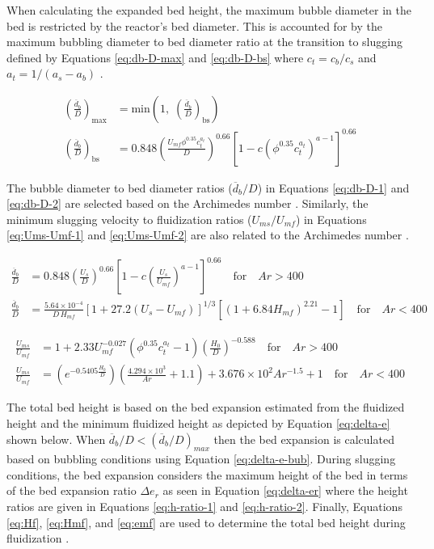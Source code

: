 \documentclass[12pt]{article}
\begin{document}
When calculating the expanded bed height, the maximum bubble diameter in the bed is restricted by the reactor's bed diameter. This is accounted for by the maximum bubbling diameter to bed diameter ratio at the transition to slugging defined by Equations \ref{eq:db-D-max} and \ref{eq:db-D-bs} where $c_t = c_b / c_s$ and $a_t = 1 / (a_s - a_b)$ \cite{Agu-2019g}.

\begin{align}
    \left( \frac{\overline{d}_b}{D} \right)_\text{max} &= \text{min} \left(1,\; \left( \frac{\overline{d}_b}{D} \right)_\text{bs} \right) \label{eq:db-D-max} \\
    \left( \frac{\overline{d}_b}{D} \right)_\text{bs} &= 0.848 \left( \frac{U_{mf} \phi^{0.35} c_t^{a_t}}{D} \right)^{0.66} \left[ 1 - c (\phi^{0.35} c_t^{a_t})^{a-1} \right]^{0.66} \label{eq:db-D-bs}
\end{align}

The bubble diameter to bed diameter ratios ($\overline{d}_b/D$) in Equations \ref{eq:db-D-1} and \ref{eq:db-D-2} are selected based on the Archimedes number \cite{Agu-2019a, Werther-1974}. Similarly, the minimum slugging velocity to fluidization ratios ($U_{ms}/U_{mf}$) in Equations \ref{eq:Ums-Umf-1} and \ref{eq:Ums-Umf-2} are also related to the Archimedes number \cite{Agu-2018, Shaul-2012}.

\begin{align}
    \frac{\overline{d}_b}{D} &= 0.848 \left(\frac{U_s}{D} \right)^{0.66} \left[1 - c \left(\frac{U_s}{U_{mf}} \right)^{a - 1} \right]^{0.66} \quad \text{for}\quad Ar > 400 \label{eq:db-D-1} \\
    \frac{\overline{d}_b}{D} &= \frac{5.64\times10^{-4}}{D\,H_{mf}} \left[1 + 27.2 (U_s - U_{mf}) \right]^{1/3} \left[(1 + 6.84 H_{mf})^{2.21} - 1 \right] \quad \text{for}\quad Ar < 400 \label{eq:db-D-2}
\end{align}

\begin{align}
    \frac{U_{ms}}{U_{mf}} &= 1 + 2.33 U_{mf}^{-0.027} \left(\phi^{0.35} c_t^{a_t}-1 \right) \left(\frac{H_0}{D} \right)^{-0.588} \quad \text{for}\quad Ar > 400 \label{eq:Ums-Umf-1} \\
    \frac{U_{ms}}{U_{mf}} &= \left(e^{-0.5405 \frac{H_0}{D}} \right) \left(\frac{4.294\times10^3}{Ar} + 1.1 \right) + 3.676\times10^2 Ar^{-1.5} + 1 \quad \text{for}\quad Ar < 400 \label{eq:Ums-Umf-2}
\end{align}

The total bed height is based on the bed expansion estimated from the fluidized height and the minimum fluidized height as depicted by Equation \ref{eq:delta-e} shown below. When $\overline{d}_b/D < (\overline{d}_b/D)_{max}$ then the bed expansion is calculated based on bubbling conditions using Equation \ref{eq:delta-e-bub}. During slugging conditions, the bed expansion considers the maximum height of the bed in terms of the bed expansion ratio $\Delta e_r$ as seen in Equation \ref{eq:delta-er} where the height ratios are given in Equations \ref{eq:h-ratio-1} and \ref{eq:h-ratio-2}. Finally, Equations \ref{eq:Hf}, \ref{eq:Hmf}, and \ref{eq:emf} are used to determine the total bed height during fluidization \cite{Agu-2019b, Agu-2019f, Agu-2019g, Wen-1966}.
\end{document}

